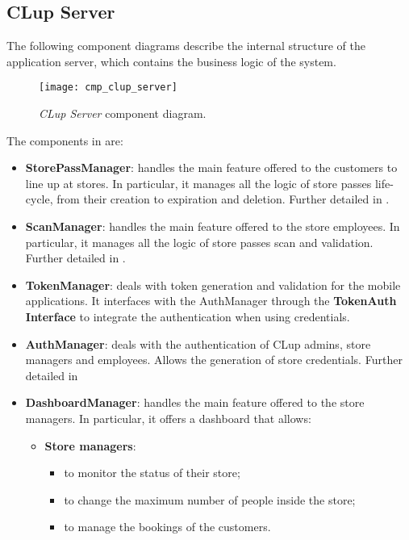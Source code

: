 \clearpage

\subsection{CLup Server}
The following component diagrams describe the internal structure of the application server, which contains the business logic of the system.

\begin{figure}[H]
	\centering
	\texttt{[image: cmp\_clup\_server]}
	\caption{\textit{CLup Server} component diagram.}
	\label{fig:cmp_clup_server}
\end{figure}
\clearpage

The components in  are:
\begin{itemize}
	\item \textbf{StorePassManager}: handles the main feature offered to the customers to line up at stores. In particular, it manages all the logic of store passes life-cycle, from their creation to expiration and deletion. Further detailed in .
	
	\item \textbf{ScanManager}: handles the main feature offered to the store employees. In particular, it manages all the logic of store passes scan and validation. Further detailed in .
	
	\item \textbf{TokenManager}: deals with token generation and validation for the mobile applications. It interfaces with the AuthManager through the \textbf{TokenAuth Interface} to integrate the authentication when using credentials.
	
	\item \textbf{AuthManager}: deals with the authentication of CLup admins, store managers and employees. Allows the generation of store credentials. Further detailed in 
	
	\item \textbf{DashboardManager}: handles the main feature offered to the store managers. In particular, it offers a dashboard that allows:
	\begin{itemize}
		\item \textbf{Store managers}:
				\begin{itemize}
					\item to monitor the status of their store;
					\item to change the maximum number of people inside the store;
					\item to manage the bookings of the customers.
				\end{itemize}
			

\end{itemize}
\end{itemize}
